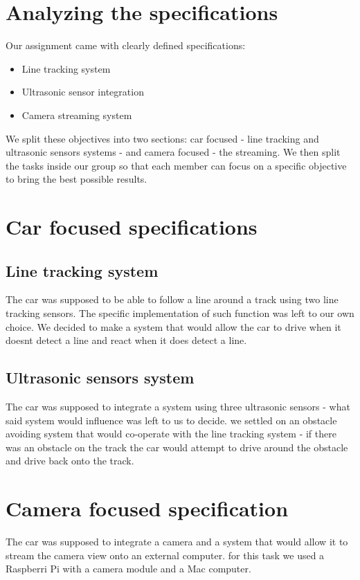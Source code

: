 \documentclass[conference]{IEEEtran}
\begin{document}
\section{Analyzing the specifications}

Our assignment came with clearly defined specifications:
\begin{itemize}
\item Line tracking system
\item Ultrasonic sensor integration
\item Camera streaming system
\end{itemize}
We split these objectives into two sections: car focused - line tracking and ultrasonic sensors systems - and camera focused - the streaming.
We then split the tasks inside our group so that each member can focus on a specific objective to bring the best possible results.


\section{Car focused specifications}
\subsection{Line tracking system}
The car was supposed to be able to follow a line around a track using two line tracking sensors. The specific implementation of such function was left to our own choice.
We decided to make a system that would allow the car to drive when it doesnt detect a line and react when it does detect a line.

\subsection{Ultrasonic sensors system}
The car was supposed to integrate a system using three ultrasonic sensors - what said system would influence was left to us to decide.
we settled on an obstacle avoiding system that would co-operate with the line tracking system - if there was an obstacle on the track the car
would attempt to drive around the obstacle and drive back onto the track.

\section{Camera focused specification}
The car was supposed to integrate a camera and a system that would allow it to stream the camera view onto an external computer.
for this task we used a Raspberri Pi with a camera module and a Mac computer.
\end{document}
